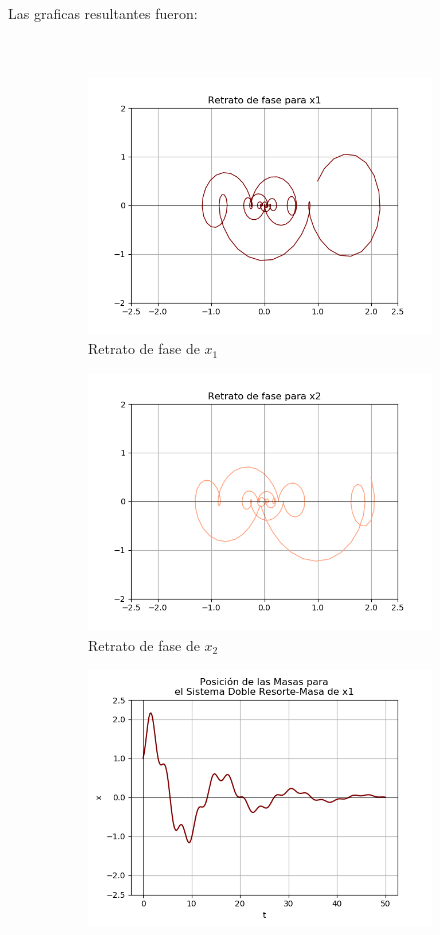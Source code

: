 \documentclass[12pt]{article}
\begin{document}
Las graficas resultantes fueron: \\ \\ \\
\begin{figure}[h!]
\begin{subfigure}{.55\textwidth}
  \centering
  \includegraphics[width=.8\linewidth]{Ej2_41.png}
  \caption{Retrato de fase de $x_1$}
  \label{fig:sfig2}
\end{subfigure}
\begin{subfigure}{.55\textwidth}
  \centering
  \includegraphics[width=.8\linewidth]{Ej2_42.png}
  \caption{Retrato de fase de $x_2$}
  \label{fig:sfig2}
\end{subfigure}
\begin{subfigure}{.55\textwidth}
  \centering
  \includegraphics[width=.8\linewidth]{Ej2_43.png}

\end{subfigure}
\end{figure}
\end{document}
